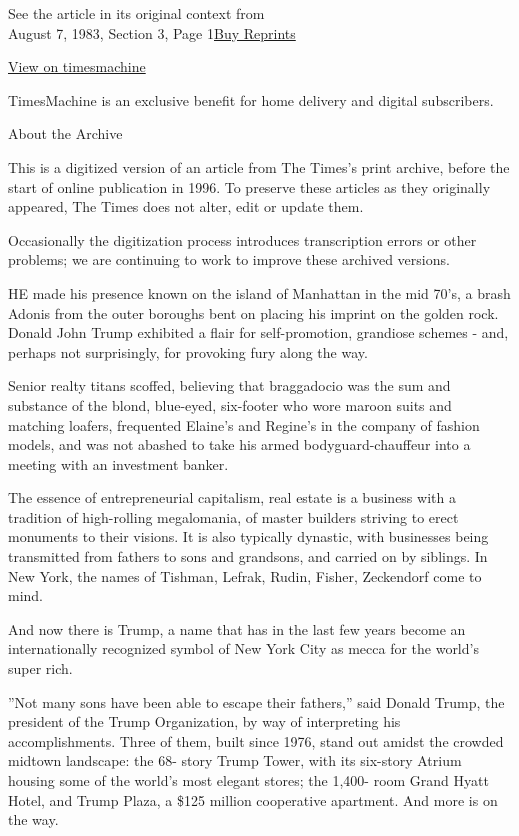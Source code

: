 See the article in its original context from\\
August 7, 1983, Section 3, Page
1\href{https://store.nytimes.com/collections/new-york-times-page-reprints?utm_source=nytimes\&utm_medium=article-page\&utm_campaign=reprints}{Buy
Reprints}

\href{http://timesmachine.nytimes.com/timesmachine/1983/08/07/086000.html}{View
on timesmachine}

TimesMachine is an exclusive benefit for home delivery and digital
subscribers.

About the Archive

This is a digitized version of an article from The Times's print
archive, before the start of online publication in 1996. To preserve
these articles as they originally appeared, The Times does not alter,
edit or update them.

Occasionally the digitization process introduces transcription errors or
other problems; we are continuing to work to improve these archived
versions.

HE made his presence known on the island of Manhattan in the mid 70's, a
brash Adonis from the outer boroughs bent on placing his imprint on the
golden rock. Donald John Trump exhibited a flair for self-promotion,
grandiose schemes - and, perhaps not surprisingly, for provoking fury
along the way.

Senior realty titans scoffed, believing that braggadocio was the sum and
substance of the blond, blue-eyed, six-footer who wore maroon suits and
matching loafers, frequented Elaine's and Regine's in the company of
fashion models, and was not abashed to take his armed
bodyguard-chauffeur into a meeting with an investment banker.

The essence of entrepreneurial capitalism, real estate is a business
with a tradition of high-rolling megalomania, of master builders
striving to erect monuments to their visions. It is also typically
dynastic, with businesses being transmitted from fathers to sons and
grandsons, and carried on by siblings. In New York, the names of
Tishman, Lefrak, Rudin, Fisher, Zeckendorf come to mind.

And now there is Trump, a name that has in the last few years become an
internationally recognized symbol of New York City as mecca for the
world's super rich.

''Not many sons have been able to escape their fathers,'' said Donald
Trump, the president of the Trump Organization, by way of interpreting
his accomplishments. Three of them, built since 1976, stand out amidst
the crowded midtown landscape: the 68- story Trump Tower, with its
six-story Atrium housing some of the world's most elegant stores; the
1,400- room Grand Hyatt Hotel, and Trump Plaza, a \$125 million
cooperative apartment. And more is on the way.

